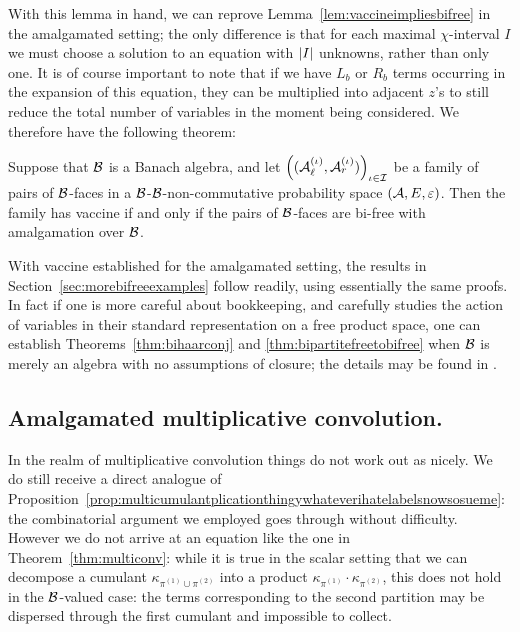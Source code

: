 	  With this lemma in hand, we can reprove Lemma~\ref{lem:vaccineimpliesbifree} in the amalgamated setting; the only difference is that for each maximal $\chi$-interval $I$ we must choose a solution to an equation with $\left|I\right|$ unknowns, rather than only one.
	  It is of course important to note that if we have $L_b$ or $R_b$ terms occurring in the expansion of this equation, they can be multiplied into adjacent $z$'s to still reduce the total number of variables in the moment being considered.
	  We therefore have the following theorem:
	  \begin{theorem}
		  Suppose that $\mathcal{B}$ is a Banach algebra, and let $\left((\mathcal{A}_\ell^{(\iota)}, \mathcal{A}_r^{(\iota)})\right)_{\iota\in\mathcal{I}}$ be a family of pairs of $\mathcal{B}$-faces in a $\mathcal{B}$-$\mathcal{B}$-non-commutative probability space $(\mathcal{A}, E, \varepsilon)$.
		  Then the family has vaccine if and only if the pairs of $\mathcal{B}$-faces are bi-free with amalgamation over $\mathcal{B}$.
	  \end{theorem}

	  With vaccine established for the amalgamated setting, the results in Section~\ref{sec:morebifreeexamples} follow readily, using essentially the same proofs.
	  In fact if one is more careful about bookkeeping, and carefully studies the action of variables in their standard representation on a free product space, one can establish Theorems~\ref{thm:bihaarconj} and \ref{thm:bipartitefreetobifree} when $\mathcal{B}$ is merely an algebra with no assumptions of closure; the details may be found in \cite{Charlesworth:2015aa}.

	  \subsection{Amalgamated multiplicative convolution.}
	  In the realm of multiplicative convolution things do not work out as nicely.
	  We do still receive a direct analogue of Proposition~\ref{prop:multicumulantplicationthingywhateverihatelabelsnowsosueme}: the combinatorial argument we employed goes through without difficulty.
	  However we do not arrive at an equation like the one in Theorem~\ref{thm:multiconv}: while it is true in the scalar setting that we can decompose a cumulant $\kappa_{\pi^{(1)}\cup\pi^{(2)}}$ into a product $\kappa_{\pi^{(1)}}\cdot\kappa_{\pi^{(2)}}$, this does not hold in the $\mathcal{B}$-valued case: the terms corresponding to the second partition may be dispersed through the first cumulant and impossible to collect.
